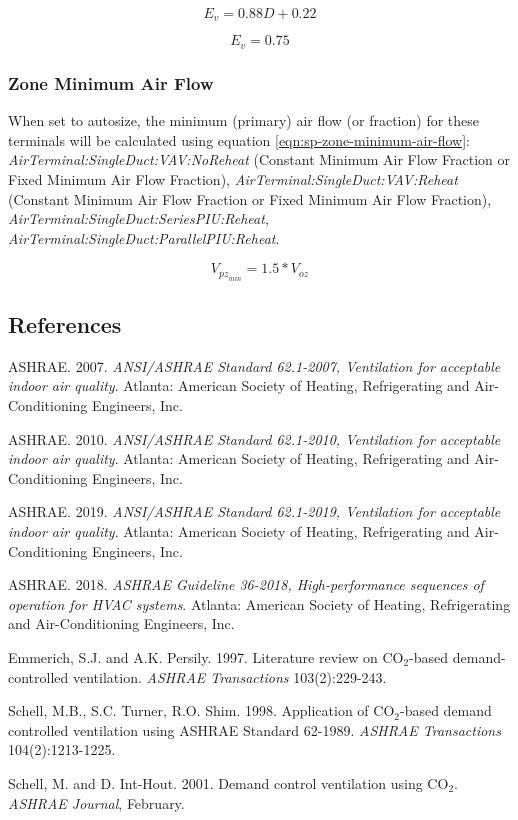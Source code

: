 \begin{equation}\label{eqn:ev-high-d}
{E_{v}} = 0.88 {D} + 0.22
\end{equation}

\begin{equation}\label{eqn:ev-low-d}
{E_{v}} = 0.75
\end{equation}

\subsubsection{Zone Minimum Air Flow}\label{sp-zone-minimum-air-flow}
When set to autosize, the minimum (primary) air flow (or fraction) for these terminals will be calculated using equation \ref{eqn:sp-zone-minimum-air-flow}: \emph{AirTerminal:SingleDuct:VAV:NoReheat} (Constant Minimum Air Flow Fraction or Fixed Minimum Air Flow Fraction), \emph{AirTerminal:SingleDuct:VAV:Reheat} (Constant Minimum Air Flow Fraction or Fixed Minimum Air Flow Fraction), \emph{AirTerminal:SingleDuct:SeriesPIU:Reheat}, \emph{AirTerminal:SingleDuct:ParallelPIU:Reheat}.

\begin{equation}\label{eqn:sp-zone-minimum-air-flow}
{V_{{pz}_{min}}} = 1.5 * {V_{oz}}
\end{equation}

\subsection{References}\label{references-018}

ASHRAE. 2007. \emph{ANSI/ASHRAE Standard 62.1-2007, Ventilation for acceptable indoor air quality}. Atlanta: American Society of Heating, Refrigerating and Air-Conditioning Engineers, Inc.

ASHRAE. 2010. \emph{ANSI/ASHRAE Standard 62.1-2010, Ventilation for acceptable indoor air quality}. Atlanta: American Society of Heating, Refrigerating and Air-Conditioning Engineers, Inc.

ASHRAE. 2019. \emph{ANSI/ASHRAE Standard 62.1-2019, Ventilation for acceptable indoor air quality}. Atlanta: American Society of Heating, Refrigerating and Air-Conditioning Engineers, Inc.

ASHRAE. 2018. \emph{ASHRAE Guideline 36-2018, High-performance sequences of operation for HVAC systems}. Atlanta: American Society of Heating, Refrigerating and Air-Conditioning Engineers, Inc.

Emmerich, S.J. and A.K. Persily. 1997. Literature review on CO\(_{2}\)-based demand-controlled ventilation. \emph{ASHRAE Transactions} 103(2):229-243.

Schell, M.B., S.C. Turner, R.O. Shim. 1998. Application of CO\(_{2}\)-based demand controlled ventilation using ASHRAE Standard 62-1989. \emph{ASHRAE Transactions} 104(2):1213-1225.

Schell, M. and D. Int-Hout. 2001. Demand control ventilation using CO\(_{2}\). \emph{ASHRAE Journal}, February.
